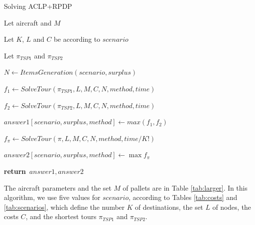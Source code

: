 \documentclass[preprint]{elsarticle}
\renewcommand{\Return}{\State \textbf{return}~}
\begin{document}
\begin{algorithm}[H]
	\caption{Solving ACLP+RPDP}  \label{alg:main}
	\begin{algorithmic}[1]
		

		\State Let aircraft and $M$  \label{main:M} 
		
		\State Let $K$, $L$\/ and $C$ be according to $scenario$ \label{main:KLC} 
		
		\State Let $\pi_{TSP1}$\/ and $\pi_{TSP2}$  
		
		\State $N \gets ItemsGeneration(scenario, surplus)$ \label{main:items} 
		
		 
		
			\State $f_1 \gets SolveTour(\pi_{TSP1}, L, M, C, N, method, time)$  \label{main:f1} 

		    \State $f_2 \gets SolveTour(\pi_{TSP2}, L, M, C, N, method, time)$  \label{main:f2}
		
			\State $answer1[scenario,surplus,method] \gets max( f_1, f_2  )$  \label{main:a1} 
			
			 \label{main:loop1} 
			
				\State $f_{\pi} \gets SolveTour(\pi, L, M, C, N, method, time/K!)$  \label{main:fpi}
				
			\EndFor \label{main:loop2}
			\State $answer2[scenario,surplus,method] \gets \max f_{\pi}$ \label{main:a2} 
		\EndFor
		
		\Return $answer1, answer2$
		
		\EndProcedure
		
	\end{algorithmic}
\end{algorithm}


The aircraft parameters and the set $M$\/ of pallets are in Table \ref{tab:larger}. In this algorithm, we use five values for $scenario$, according to Tables \ref{tab:costs} and \ref{tab:scenarios}, which define the number $K$ of destinations, the set $L$\/ of nodes, the costs $C$\/, and the shortest tours $\pi_{TSP1}$\/ and $\pi_{TSP2}$.
\end{document}
